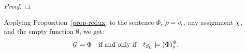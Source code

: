 \begin{proof}


 \end{proof}
 
 Applying Proposition~\ref{prop-redux} to the sentence $\Phi$, $\rho=v_{\iota}$, any assignment $\chi$, and
 the empty function $\emptyset$, we get:
 \[\CGS \models \Phi \quad \mbox{if and only if}\quad
\unfold[\KS_{\CGS}]{} \models
 \tr[\emptyset]{\Phi}.\]


  
